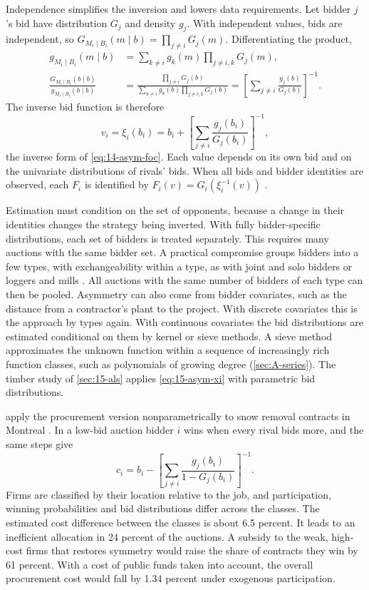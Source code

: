 Independence simplifies the inversion and lowers data requirements. Let bidder $j$'s bid have distribution
$G_j$ and density $g_j$. With independent values, bids are independent, so
$G_{M_i\mid B_i}(m\mid b)=\prod_{j\ne i}G_j(m)$. Differentiating the product,
\begin{align*}
  g_{M_i\mid B_i}(m\mid b)&=\sum_{k\ne i}g_k(m)\prod_{j\ne i,k}G_j(m),\\
  \frac{G_{M_i\mid B_i}(b\mid b)}{g_{M_i\mid B_i}(b\mid b)}
  &=\frac{\prod_{j\ne i}G_j(b)}{\sum_{k\ne i}g_k(b)\prod_{j\ne i,k}G_j(b)}
  =\left[\sum_{j\ne i}\frac{g_j(b)}{G_j(b)}\right]^{-1}.
\end{align*}
The inverse bid function is therefore
\begin{equation}\label{eq:15-asym-xi}
  v_i=\xi_i(b_i)=b_i+\left[\sum_{j\ne i}\frac{g_j(b_i)}{G_j(b_i)}\right]^{-1},
\end{equation}
the inverse form of \eqref{eq:14-asym-foc}. Each value depends on its own bid and on the univariate
distributions of rivals' bids. When all bids and bidder identities are observed, each $F_i$ is identified
by $F_i(v)=G_i(\xi_i^{-1}(v))$ \citep[Theorem~3.1(ii)]{AtheyHaile2007}.

Estimation must condition on the set of opponents, because a change in their identities changes the
strategy being inverted. With fully bidder-specific distributions, each set of bidders is treated separately.
This requires many auctions with the same bidder set. A practical compromise groups bidders into a few
types, with exchangeability within a type, as with joint and solo bidders or loggers and mills
\citep[Section~3.2.2]{AtheyHaile2007}. All auctions with the same number of bidders of each type can then be
pooled. Asymmetry can also come from bidder covariates, such as the distance from a contractor's plant to the
project. With discrete covariates this is the approach by types again. With continuous covariates the bid
distributions are estimated conditional on them by kernel or sieve methods. A sieve method approximates the
unknown function within a sequence of increasingly rich function classes, such as polynomials of growing degree
(\cref{sec:A-series}). The timber study of
\cref{sec:15-als} applies \eqref{eq:15-asym-xi} with parametric bid distributions.

\citet{FlambardPerrigne2006} apply the procurement version nonparametrically to snow removal contracts in
Montreal \citep[p.~102]{HortacsuPerrigne2021}. In a low-bid auction bidder $i$ wins when every rival bids
more, and the same steps give
\begin{equation*}
  c_i=b_i-\left[\sum_{j\ne i}\frac{g_j(b_i)}{1-G_j(b_i)}\right]^{-1}.
\end{equation*}
Firms are classified by their location relative to the job, and participation, winning probabilities and bid
distributions differ across the classes. The estimated cost difference between the classes is about 6.5
percent. It leads to an inefficient allocation in 24 percent of the auctions. A subsidy to the weak,
high-cost firms that restores symmetry would raise the share of contracts they win by 61 percent. With a cost
of public funds taken into account, the overall procurement cost would fall by 1.34 percent under exogenous
participation.

